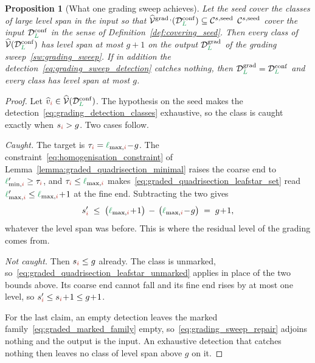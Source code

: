 \documentclass[a4paper, 12pt]{article}
\makeatletter
\newcommand{\robert}[1]{{\color{orange} #1}}
\DeclareRobustCommand{\gradeClasses}[1][]{\widehat{\V}^{\mathrm{grad} \, \ifx\@empty#1\@empty\else,#1\fi}}
\DeclareRobustCommand{\candC}[1][]{\mathcal{C}^{s\ifx\@empty#1\@empty\else,#1\fi}}
\newcommand{\lminIdx}[1]{\l_{\min,#1}}
\newcommand{\lmaxIdx}[1]{\l_{\max,#1}}
\newcommand{\levelSpan}[1]{s_{#1}}
\newcommand{\targetlevel}{\tau}                                 %
\newcommand{\green}{\color{ForestGreen}}
\newcommand{\brickred}{\color{BrickRed}}
\newcommand{\V}{\mathcal{V}}
\newcommand{\vertexClass}[1]{\widehat{v}_{#1}}
\newcommand{\vertexClasses}{\widehat{\V}}
\newcommand{\coarseIdxone}{{\brickred i}}
\renewcommand{\l}{{\green\ell}}
\renewcommand{\L}{{\green L}}
\newtheorem{proposition}[theorem]{Proposition}
\theoremstyle{definition}
\theoremstyle{plain}
\numberwithin{equation}{section}
\newcommand{\tobecut}[1]{{\color{red} #1}}     %
\DeclareRobustCommand{\domseq}[1][]{\mathcal{D}\ifx\@empty#1\@empty\else_{#1}\fi}
\makeatother
\begin{document}
\begin{proposition}[What one grading sweep achieves]
    \label{prop:grading_span}
    Let the seed \tobecut{cover the classes of large level span in the input so that $\gradeClasses(\domseq[\L]^{\mathrm{conf}}) \subseteq \candC[\mathrm{seed}]$}\robert{$\candC[\mathrm{seed}]$ cover the input $\domseq[\L]^{\mathrm{conf}}$ in the sense of Definition~\ref{def:covering_seed}}. Then every class of $\vertexClasses(\domseq[\L]^{\mathrm{conf}})$ has level span at most $g \! + \! 1$ on the output $\domseq[\L]^{\mathrm{grad}}$ of the grading sweep~\ref{sw:grading_sweep}. If in addition the detection~\eqref{eq:grading_sweep_detection} catches nothing, then $\domseq[\L]^{\mathrm{grad}} = \domseq[\L]^{\mathrm{conf}}$ and every class has level span at most $g$.
\end{proposition}
\begin{proof}
    Let $\vertexClass{\coarseIdxone} \in \vertexClasses(\domseq[\L]^{\mathrm{conf}})$. The hypothesis on the seed makes the detection~\eqref{eq:grading_detection_classes} exhaustive, so the class is caught exactly when $\levelSpan{\coarseIdxone} > g$. Two cases follow.

    \emph{Caught.} The target is $\targetlevel_\coarseIdxone = \lmaxIdx{\coarseIdxone} \! - \! g$. The constraint~\eqref{eq:homogenisation_constraint} of Lemma~\ref{lemma:graded_quadrisection_minimal} raises the coarse end to $\lminIdx{\coarseIdxone}' \geq \targetlevel_\coarseIdxone$, and $\targetlevel_\coarseIdxone \leq \lmaxIdx{\coarseIdxone}$ makes~\eqref{eq:graded_quadrisection_leafstar_set} read $\lmaxIdx{\coarseIdxone}' \leq \lmaxIdx{\coarseIdxone} \! + \! 1$ at the fine end. Subtracting the two gives
    \begin{equation*}
        \levelSpan{\coarseIdxone}' \; \leq \; \big( \lmaxIdx{\coarseIdxone} \! + \! 1 \big) \, - \, \big( \lmaxIdx{\coarseIdxone} \! - \! g \big) \; = \; g \! + \! 1 ,
    \end{equation*}
    whatever the level span was before. This is where the residual level of the grading comes from.

    \emph{Not caught.} Then $\levelSpan{\coarseIdxone} \leq g$ already. The class is unmarked, so~\eqref{eq:graded_quadrisection_leafstar_unmarked} applies in place of the two bounds above. Its coarse end cannot fall and its fine end rises by at most one level, so $\levelSpan{\coarseIdxone}' \leq \levelSpan{\coarseIdxone} \! + \! 1 \leq g \! + \! 1$.

    For the last claim, an empty detection leaves the marked family~\eqref{eq:graded_marked_family} empty, so~\eqref{eq:grading_sweep_repair} adjoins nothing and the output is the input. An exhaustive detection that catches nothing then leaves no class of level span above $g$ on it.
\end{proof}
\end{document}
